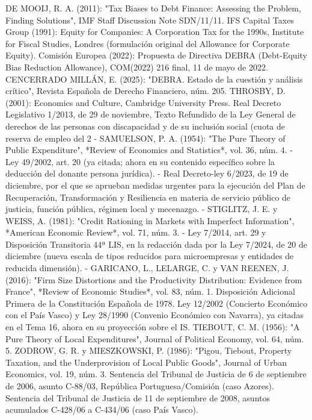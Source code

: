\documentclass[10pt,a4paper]{article}
\begin{document}
DE MOOIJ, R. A. (2011): "Tax Biases to Debt Finance: Assessing the Problem, Finding Solutions", IMF Staff Discussion Note SDN/11/11.
IFS Capital Taxes Group (1991): Equity for Companies: A Corporation Tax for the 1990s, Institute for Fiscal Studies, Londres (formulación original del Allowance for Corporate Equity).
Comisión Europea (2022): Propuesta de Directiva DEBRA (Debt-Equity Bias Reduction Allowance), COM(2022) 216 final, 11 de mayo de 2022.
CENCERRADO MILLÁN, E. (2025): "DEBRA. Estado de la cuestión y análisis crítico", Revista Española de Derecho Financiero, núm. 205.
THROSBY, D. (2001): Economics and Culture, Cambridge University Press.
Real Decreto Legislativo 1/2013, de 29 de noviembre, Texto Refundido de la Ley General de derechos de las personas con discapacidad y de su inclusión social (cuota de reserva de empleo del 2%
- SAMUELSON, P. A. (1954): "The Pure Theory of Public Expenditure", *Review of Economics and Statistics*, vol. 36, núm. 4.
- Ley 49/2002, art. 20 (ya citada; ahora en su contenido específico sobre la deducción del donante persona jurídica).
- Real Decreto-ley 6/2023, de 19 de diciembre, por el que se aprueban medidas urgentes para la ejecución del Plan de Recuperación, Transformación y Resiliencia en materia de servicio público de justicia, función pública, régimen local y mecenazgo.
- STIGLITZ, J. E. y WEISS, A. (1981): "Credit Rationing in Markets with Imperfect Information", *American Economic Review*, vol. 71, núm. 3.
- Ley 7/2014, art. 29 y Disposición Transitoria 44ª LIS, en la redacción dada por la Ley 7/2024, de 20 de diciembre (nueva escala de tipos reducidos para microempresas y entidades de reducida dimensión).
- GARICANO, L., LELARGE, C. y VAN REENEN, J. (2016): "Firm Size Distortions and the Productivity Distribution: Evidence from France", *Review of Economic Studies*, vol. 83, núm. 1.
Disposición Adicional Primera de la Constitución Española de 1978.
Ley 12/2002 (Concierto Económico con el País Vasco) y Ley 28/1990 (Convenio Económico con Navarra), ya citadas en el Tema 16, ahora en su proyección sobre el IS.
TIEBOUT, C. M. (1956): "A Pure Theory of Local Expenditures", Journal of Political Economy, vol. 64, núm. 5.
ZODROW, G. R. y MIESZKOWSKI, P. (1986): "Pigou, Tiebout, Property Taxation, and the Underprovision of Local Public Goods", Journal of Urban Economics, vol. 19, núm. 3.
Sentencia del Tribunal de Justicia de 6 de septiembre de 2006, asunto C-88/03, República Portuguesa/Comisión (caso Azores).
Sentencia del Tribunal de Justicia de 11 de septiembre de 2008, asuntos acumulados C-428/06 a C-434/06 (caso País Vasco).
\end{document}
